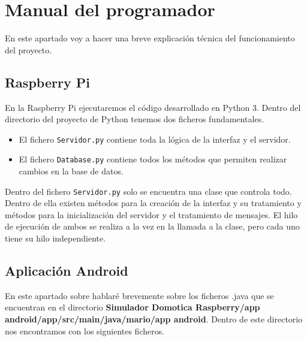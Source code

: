 \section{Manual del programador}

En este apartado voy a hacer una breve explicación técnica del funcionamiento del proyecto.

\subsection{Raspberry Pi}

En la Raspberry Pi ejecutaremos el código desarrollado en Python 3. Dentro del directorio del proyecto de Python tenemos dos ficheros fundamentales.

\begin{itemize}
	\item El fichero \verb|Servidor.py| contiene toda la lógica de la interfaz y el servidor.
	\item El fichero \verb|Database.py| contiene todos los métodos que permiten realizar cambios en la base de datos.
\end{itemize}

Dentro del fichero \verb|Servidor.py| solo se encuentra una clase que controla todo. Dentro de ella existen métodos para la creación de la interfaz y su tratamiento y métodos para la inicialización del servidor y el tratamiento de mensajes. El hilo de ejecución de ambos se realiza a la vez en la llamada a la clase, pero cada uno tiene su hilo independiente.

\subsection{Aplicación Android}\label{sec:explicacionAndroid}

En este apartado sobre hablaré brevemente sobre los ficheros .java que se encuentran en el directorio \textbf{Simulador Domotica Raspberry/app android/app/src/main/java/mario/app android}. Dentro de este directorio nos encontramos con los siguientes ficheros.

